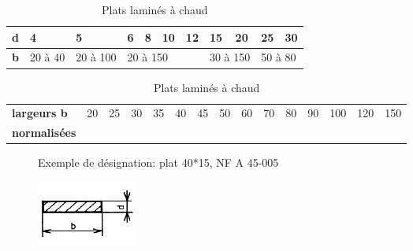 \begin{table}[!h]
 \begin{center}
  \begin{tabularx}{\linewidth}{|X|l|l|l|l|l|l|l|l|l|l|}
  \hline
  \textbf{d} & 4 & 5 & 6 & 8 & 10 & 12 & 15 & 20 & 25 & 30 \\
  \hline
  \textbf{b} & 20 à 40 & 20 à 100 & \multicolumn{4}{l|}{20 à 150} & \multicolumn{2}{l|}{30 à 150} & \multicolumn{2}{l|}{50 à 80} \\ 
  \hline
  \end{tabularx}
  \begin{tabularx}{\linewidth}{|X|l|l|l|l|l|l|l|l|l|l|l|l|l|l|}
  \hline
  \textbf{largeurs b } & 20 & 25 & 30 & 35 & 40 & 45 & 50 & 60 & 70 & 80 & 90 & 100 & 120 & 150 \\
  \textbf{normalisées} & & & & & & & & & & & & & & \\
  \hline
  \end{tabularx}
 \end{center}
 \caption{Plats laminés à chaud}
 \label{tab:tableau1}
\end{table}

\begin{figure}[!h]
 \begin{minipage}{0.69\linewidth}
 Exemple de désignation: plat 40*15, NF A 45-005
 \end{minipage}
 \hfill
 \begin{minipage}{0.3\linewidth}
  \centering\includegraphics[width=0.7\linewidth]{img/soudure1.png}
 \end{minipage}
\end{figure}

\newpage

